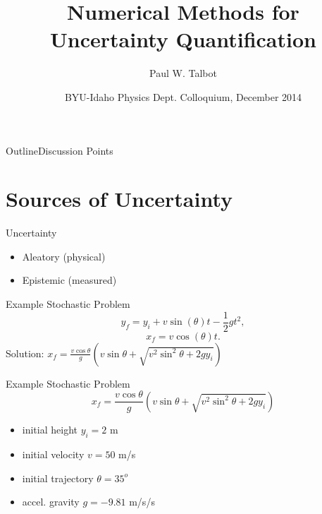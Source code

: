 \documentclass{beamer}
\title[Numerical UQ Methods] %
{Numerical Methods for Uncertainty Quantification}
\author[Talbot] %
{Paul W. Talbot\inst{1}}
\institute[University of New Mexico] %
{
  \inst{1}%
  University of New Mexico\\
   \vspace{10pt}
\footnotesize{Supported by Idaho National Laboratory}
}
\date[BYU-I, 2014] %
{BYU-Idaho Physics Dept. Colloquium, December 2014}
\begin{document}
\begin{frame}
  \titlepage
\end{frame}

\begin{frame}{Outline}{Discussion Points}\vspace{-20pt}
  \tableofcontents[pausesections]
\end{frame}

\section{Sources of Uncertainty}
\begin{frame}{Uncertainty}
\begin{itemize}
\item Aleatory (physical)
\item Epistemic (measured)
\end{itemize}
\end{frame}

\begin{frame}{Example Stochastic Problem}\vspace{-30pt}
\begin{equation}
y_f=y_i + v\sin(\theta)t - \frac{1}{2}gt^2,
\end{equation}
\begin{equation}
x_f=v\cos(\theta)t.
\end{equation}\vspace{-10pt}
Solution: $x_f=\frac{v\cos{\theta}}{g}\left(v\sin\theta+\sqrt{v^2\sin^2\theta + 2gy_i}\right)$
\end{frame}

\begin{frame}{Example Stochastic Problem}\vspace{-50pt}
\begin{equation}
x_f=\frac{v\cos{\theta}}{g}\left(v\sin\theta+\sqrt{v^2\sin^2\theta + 2gy_i}\right)
\end{equation}
\begin{itemize}
\item initial height $y_i = 2$ m
\item initial velocity $v = 50$ m/s
\item initial trajectory $\theta = 35^o$
\item accel. gravity $g = -9.81$ m/s/s
\end{itemize}
\end{frame}
\end{document}
